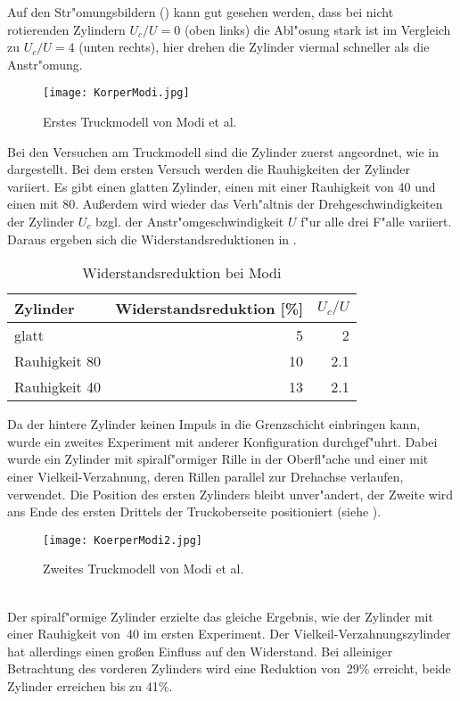 Auf den Str"omungsbildern () kann gut gesehen werden, dass bei nicht rotierenden Zylindern \(U_c/U=0\) (oben links) die Abl"osung stark ist im Vergleich zu \(U_c/U=4\) (unten rechts), hier drehen die Zylinder viermal schneller als die Anstr"omung.\\
\begin{figure}[h]
	\centering
	\texttt{[image: KorperModi.jpg]}
	\caption{Erstes Truckmodell von Modi et al. \cite{MODI.1991}}
	\label{fig:Modi}
\end{figure}
Bei den Versuchen am Truckmodell sind die Zylinder zuerst angeordnet, wie in  dargestellt. Bei dem ersten Versuch werden die Rauhigkeiten der Zylinder variiert. Es gibt einen glatten Zylinder, einen mit einer Rauhigkeit von 40 und einen mit 80. Au\ss{}erdem wird wieder das Verh"altnis der Drehgeschwindigkeiten der Zylinder \(U_c\) bzgl. der Anstr"omgeschwindigkeit \(U\) f"ur alle drei F"alle variiert. Daraus ergeben sich die Widerstandsreduktionen in .\\
\begin{table}[h]
	\centering
	\begin{tabular}{lrr}
		\toprule
		Zylinder & Widerstandsreduktion [\%] & \(U_c/U\)\\
		\midrule
		glatt & 5 & 2\\
		Rauhigkeit 80 & 10 & 2.1\\
		Rauhigkeit 40 & 13 & 2.1\\
		\bottomrule
	\end{tabular}
	\caption{Widerstandsreduktion bei Modi}
	\label{tab:Modi}
\end{table}
Da der hintere Zylinder keinen Impuls in die Grenzschicht einbringen kann, wurde ein zweites Experiment mit anderer Konfiguration durchgef"uhrt. Dabei wurde ein Zylinder mit spiralf"ormiger Rille in der Oberfl"ache und einer mit einer Vielkeil-Verzahnung, deren Rillen parallel zur Drehachse verlaufen, verwendet. Die Position des ersten Zylinders bleibt unver"andert, der Zweite wird ans Ende des ersten Drittels der Truckoberseite positioniert (siehe ).\\
\begin{figure}[h]
	\centering
	\texttt{[image: KoerperModi2.jpg]}
	\caption{Zweites Truckmodell von Modi et al. \cite{MODI.1991}}
	\label{fig:Modi2}
\end{figure}\\
Der spiralf"ormige Zylinder erzielte das gleiche Ergebnis, wie der Zylinder mit einer Rauhigkeit von~40 im ersten Experiment. Der Vielkeil-Verzahnungszylinder hat allerdings einen gro\ss{}en Einfluss auf den Widerstand. Bei alleiniger Betrachtung des vorderen Zylinders wird eine Reduktion von~29\% erreicht, beide Zylinder erreichen bis zu 41\%.


